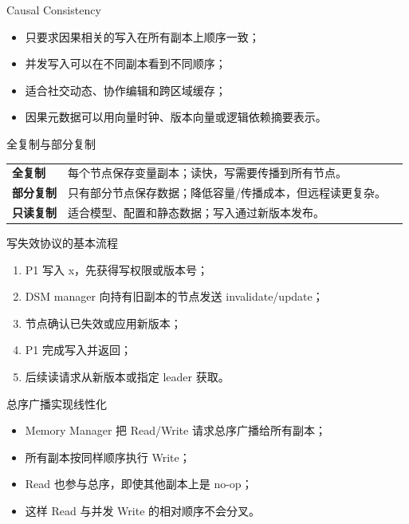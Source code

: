 \documentclass[UTF8,fontset=none,aspectratio=169,10pt]{beamer}
\begin{document}
\begin{frame}{Causal Consistency}
\begin{itemize}
  \item 只要求因果相关的写入在所有副本上顺序一致；
  \item 并发写入可以在不同副本看到不同顺序；
  \item 适合社交动态、协作编辑和跨区域缓存；
  \item 因果元数据可以用向量时钟、版本向量或逻辑依赖摘要表示。
\end{itemize}
\vfill
{}
\end{frame}


\begin{frame}{全复制与部分复制}
\begin{tabularx}{\linewidth}{>{\bfseries}p{2.8cm}XX}
\toprule
全复制 & 每个节点保存变量副本；读快，写需要传播到所有节点。 \\
部分复制 & 只有部分节点保存数据；降低容量/传播成本，但远程读更复杂。 \\
只读复制 & 适合模型、配置和静态数据；写入通过新版本发布。 \\
\bottomrule
\end{tabularx}
\end{frame}

\begin{frame}{写失效协议的基本流程}
\begin{enumerate}
  \item P1 写入 x，先获得写权限或版本号；
  \item DSM manager 向持有旧副本的节点发送 invalidate/update；
  \item 节点确认已失效或应用新版本；
  \item P1 完成写入并返回；
  \item 后续读请求从新版本或指定 leader 获取。
\end{enumerate}
\end{frame}

\begin{frame}{总序广播实现线性化}
\begin{itemize}
  \item Memory Manager 把 Read/Write 请求总序广播给所有副本；
  \item 所有副本按同样顺序执行 Write；
  \item Read 也参与总序，即使其他副本上是 no-op；
  \item 这样 Read 与并发 Write 的相对顺序不会分叉。
\end{itemize}
\vfill
{}
\end{frame}
\end{document}
